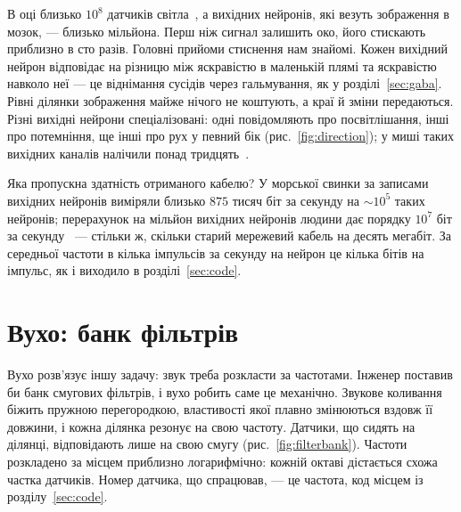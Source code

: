 В оці близько $10^8$ датчиків світла~\cite{Curcio1990}, а вихідних нейронів, які везуть зображення в мозок, --- близько мільйона. Перш ніж сигнал залишить око, його стискають приблизно в сто разів. Головні прийоми стиснення нам знайомі. Кожен вихідний нейрон відповідає на різницю між яскравістю в маленькій плямі та яскравістю навколо неї --- це віднімання сусідів через гальмування, як у розділі~\ref{sec:gaba}. Рівні ділянки зображення майже нічого не коштують, а краї й зміни передаються. Різні вихідні нейрони спеціалізовані: одні повідомляють про посвітлішання, інші про потемніння, ще інші про рух у певний бік (рис.~\ref{fig:direction}); у миші таких вихідних каналів налічили понад тридцять~\cite{Baden2016}.

Яка пропускна здатність отриманого кабелю? У морської свинки за записами вихідних нейронів виміряли близько $875$ тисяч біт за секунду на $\sim10^5$ таких нейронів; перерахунок на мільйон вихідних нейронів людини дає порядку $10^7$ біт за секунду~\cite{Koch2006} --- стільки ж, скільки старий мережевий кабель на десять мегабіт. За середньої частоти в кілька імпульсів за секунду на нейрон це кілька бітів на імпульс, як і виходило в розділі~\ref{sec:code}.

\section{Вухо: банк фільтрів}

Вухо розв'язує іншу задачу: звук треба розкласти за частотами. Інженер поставив би банк смугових фільтрів, і вухо робить саме це механічно. Звукове коливання біжить пружною перегородкою, властивості якої плавно змінюються вздовж її довжини, і кожна ділянка резонує на свою частоту. Датчики, що сидять на ділянці, відповідають лише на свою смугу (рис.~\ref{fig:filterbank}). Частоти розкладено за місцем приблизно логарифмічно: кожній октаві дістається схожа частка датчиків. Номер датчика, що спрацював, --- це частота, код місцем із розділу~\ref{sec:code}.

